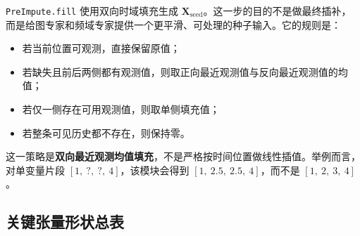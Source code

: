\documentclass[UTF8]{ctexart}
\begin{document}
\texttt{PreImpute.fill} 使用双向时域填充生成 \(\bm{X}_{\text{seed}}\)。这一步的目的不是做最终插补，而是给图专家和频域专家提供一个更平滑、可处理的种子输入。它的规则是：
\begin{itemize}
    \item 若当前位置可观测，直接保留原值；
    \item 若缺失且前后两侧都有观测值，则取正向最近观测值与反向最近观测值的均值；
    \item 若仅一侧存在可用观测值，则取单侧填充值；
    \item 若整条可见历史都不存在，则保持零。
\end{itemize}

这一策略是\textbf{双向最近观测均值填充}，不是严格按时间位置做线性插值。举例而言，对单变量片段 \([1,\ ?,\ ?,\ 4]\)，该模块会得到 \([1,\ 2.5,\ 2.5,\ 4]\)，而不是 \([1,\ 2,\ 3,\ 4]\)。

\subsection{关键张量形状总表}
\end{document}
